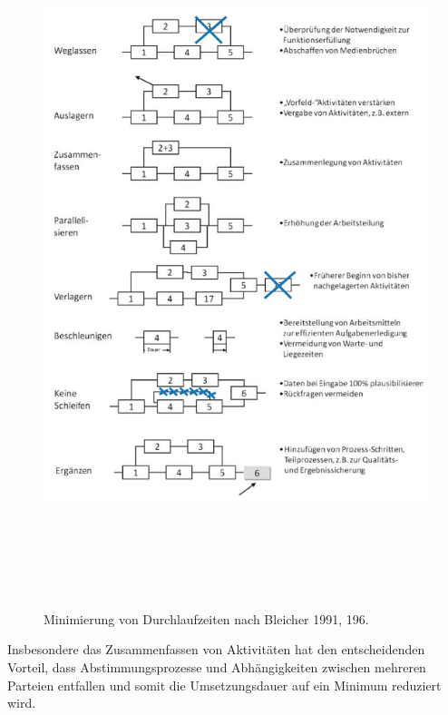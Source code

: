 \documentclass[a4paper]{article}
\begin{document}
\begin{figure}
\centering
\includegraphics[width=15.5cm,height=20.511cm]{miriamkapitel135136-img/miriamkapitel135136-img001.png}
\caption[Minimierung von Durchlaufzeiten nach Bleicher 1991, 196.]{Minimierung von Durchlaufzeiten nach Bleicher 1991,
196.}

\end{figure}

\bigskip

{\sffamily
Insbesondere das Zusammenfassen von Aktivitäten hat den entscheidenden Vorteil, dass Abstimmungsprozesse und
Abhängigkeiten zwischen mehreren Parteien entfallen und somit die Umsetzungsdauer auf ein Minimum reduziert wird. }


\bigskip
\end{document}
